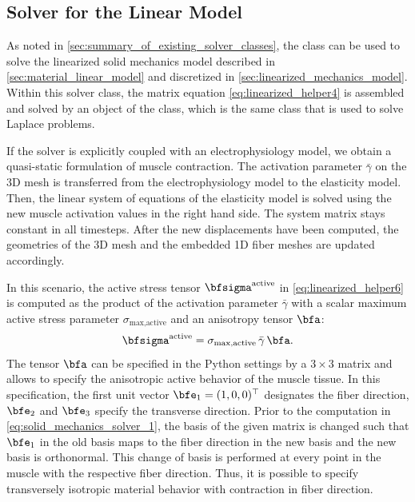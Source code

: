 \subsection{Solver for the Linear Model}\label{sec:solver_linear_model_elasticity}
As noted in \cref{sec:summary_of_existing_solver_classes}, the  class can be used to solve the linearized solid mechanics model described in \cref{sec:material_linear_model} and discretized in \cref{sec:linearized_mechanics_model}. 
Within this solver class, the matrix equation \cref{eq:linearized_helper4} is assembled and solved by an object of the  class, which is the same class that is used to solve  Laplace problems.

If the solver is explicitly coupled with an electrophysiology model, we obtain a quasi-static formulation of muscle contraction. The activation parameter $\bar{\gamma}$ on the 3D mesh is transferred from the electrophysiology model to the elasticity model.
Then, the linear system of equations of the elasticity model is solved using the new muscle activation values in the right hand side. The system matrix stays constant in all timesteps. After the new displacements have been computed, the geometries of the 3D mesh and the embedded 1D fiber meshes are updated accordingly.

In this scenario, the active stress tensor $\bfsigma^\text{active}$ in \cref{eq:linearized_helper6} is computed as the product of the activation parameter $\bar{\gamma}$ with a scalar maximum active stress parameter $\sigma_\text{max,active}$ and an anisotropy tensor $\bfa$:
\begin{align}\label{eq:solid_mechanics_solver_1}
  \bfsigma^\text{active} = \sigma_\text{max,active} \,\bar{\gamma}\,\bfa.
\end{align}
The tensor $\bfa$ can be specified in the Python settings by a $3 \times 3$ matrix and allows to specify the anisotropic active behavior of the muscle tissue. In this specification, the first unit vector $\bfe_1=(1,0,0)^\top$ designates the fiber direction, $\bfe_2$ and $\bfe_3$ specify the transverse direction. Prior to the computation in \cref{eq:solid_mechanics_solver_1}, the basis of the given matrix is changed such that $\bfe_1$ in the old basis maps to the fiber direction in the new basis and the new basis is orthonormal. This change of basis is performed at every point in the muscle with the respective fiber direction. Thus, it is possible to specify transversely isotropic material behavior with contraction in fiber direction.

